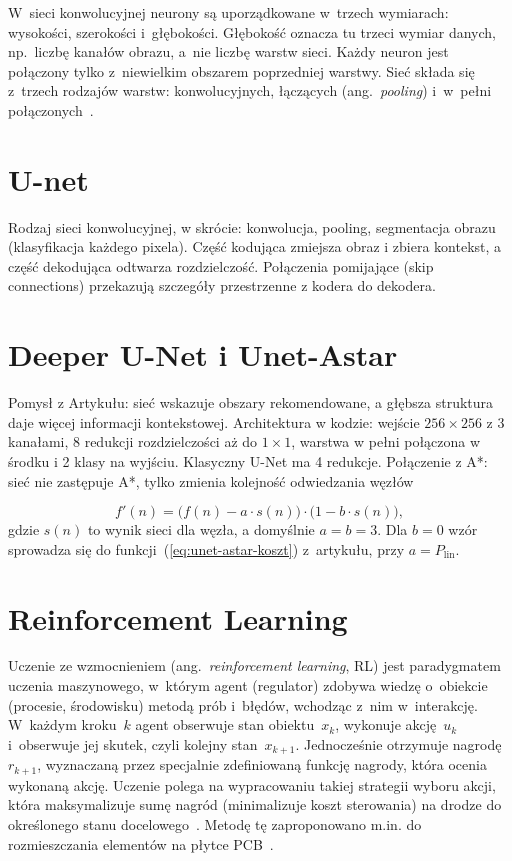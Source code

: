 W~sieci konwolucyjnej neurony są uporządkowane w~trzech wymiarach:
wysokości, szerokości i~głębokości. Głębokość oznacza tu trzeci wymiar
danych, np.~liczbę kanałów obrazu, a~nie liczbę warstw sieci. Każdy neuron
jest połączony tylko z~niewielkim obszarem poprzedniej warstwy. Sieć
składa się z~trzech rodzajów warstw: konwolucyjnych, łączących
(ang.~\emph{pooling}) i~w~pełni połączonych~\cite{OShea2015CNN}.


\section{U-net}
Rodzaj sieci konwolucyjnej, w skrócie: konwolucja, pooling, segmentacja obrazu 
(klasyfikacja każdego pixela).
Część kodująca zmiejsza obraz i zbiera kontekst, a część dekodująca odtwarza rozdzielczość.
Połączenia pomijające (skip connections) przekazują szczegóły przestrzenne z kodera do dekodera.

\section{Deeper U-Net i Unet-Astar}
Pomysł z Artykułu: sieć wskazuje obszary rekomendowane, a głębsza struktura daje więcej informacji kontekstowej.
Architektura w kodzie: wejście $256 \times 256$ z 3 kanałami, 8 redukcji rozdzielczości aż do $1 \times 1$, warstwa w pełni połączona
w środku i 2 klasy na wyjściu. Klasyczny U-Net ma 4 redukcje.
Połączenie z A*: sieć nie zastępuje A*, tylko zmienia kolejność odwiedzania węzłów

\begin{equation}
  f'(n) = \bigl(f(n) - a \cdot s(n)\bigr) \cdot \bigl(1 - b \cdot s(n)\bigr),
  \label{eq:unet-astar-f}
\end{equation}
gdzie $s(n)$ to wynik sieci dla węzła, a domyślnie $a = b = 3$.
Dla $b = 0$ wzór sprowadza się do funkcji~(\ref{eq:unet-astar-koszt})
z~artykułu, przy $a = P_{\mathrm{lin}}$.

\section{Reinforcement Learning}

Uczenie ze wzmocnieniem (ang.~\emph{reinforcement learning}, RL) jest
paradygmatem uczenia maszynowego, w~którym agent (regulator) zdobywa wiedzę
o~obiekcie (procesie, środowisku) metodą prób i~błędów, wchodząc z~nim
w~interakcję. W~każdym kroku~$k$ agent obserwuje stan obiektu~$x_k$,
wykonuje akcję~$u_k$ i~obserwuje jej skutek, czyli kolejny stan~$x_{k+1}$.
Jednocześnie otrzymuje nagrodę~$r_{k+1}$, wyznaczaną przez specjalnie
zdefiniowaną funkcję nagrody, która ocenia wykonaną akcję. Uczenie polega
na wypracowaniu takiej strategii wyboru akcji, która maksymalizuje sumę
nagród (minimalizuje koszt sterowania) na drodze do określonego stanu
docelowego~\cite{Rak2013RL}. Metodę tę zaproponowano m.in. do
rozmieszczania elementów na płytce PCB~\cite{Vassallo2024RLPCB}.


